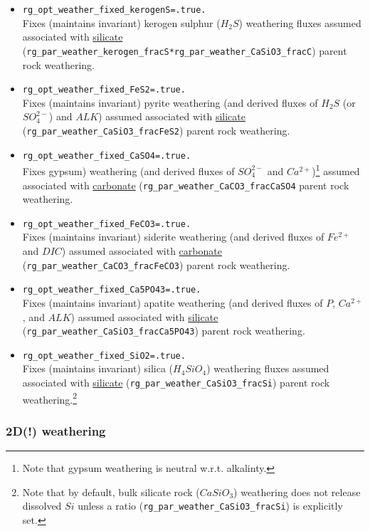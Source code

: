 \begin{enumerate}[noitemsep]
\begin{itemize}[noitemsep]
\item \texttt{rg\_opt\_weather\_fixed\_kerogenS=.true.}
\\Fixes (maintains invariant) kerogen sulphur (\(H_{2}S\)) weathering fluxes assumed associated with \uline{silicate} (\texttt{rg\_par\_weather\_kerogen\_fracS*rg\_par\_weather\_CaSiO3\_fracC}) parent rock weathering.
\item \texttt{rg\_opt\_weather\_fixed\_FeS2=.true.}
\\Fixes (maintains invariant) pyrite weathering (and derived fluxes of \(H_{2}S\) (or \(SO^{2-}_{4}\)) and \(ALK\)) assumed associated with \uline{silicate} (\texttt{rg\_par\_weather\_CaSiO3\_fracFeS2}) parent rock weathering.
\item \texttt{rg\_opt\_weather\_fixed\_CaSO4=.true.}
\\Fixes gypsum) weathering (and derived fluxes of \(SO^{2-}_{4}\) and \(Ca^{2+}\))\footnote{Note that gypsum weathering is neutral w.r.t. alkalinty.} assumed associated with \uline{carbonate} (\texttt{rg\_par\_weather\_CaCO3\_fracCaSO4} parent rock weathering.  
\item \texttt{rg\_opt\_weather\_fixed\_FeCO3=.true.}
\\Fixes (maintains invariant) siderite weathering (and derived fluxes of \(Fe^{2+}\) and \(DIC\)) assumed associated  with \uline{carbonate} (\texttt{rg\_par\_weather\_CaCO3\_fracFeCO3}) parent rock weathering.
\item \texttt{rg\_opt\_weather\_fixed\_Ca5PO43=.true.}
\\Fixes (maintains invariant)  apatite weathering (and derived fluxes of \(P\), \(Ca^{2+}\), and \(ALK\)) assumed associated with \uline{silicate} (\texttt{rg\_par\_weather\_CaSiO3\_fracCa5PO43}) parent rock weathering. \item \texttt{rg\_opt\_weather\_fixed\_SiO2=.true.}
\\Fixes (maintains invariant) silica (\(H_{4}SiO_{4}\)) weathering fluxes assumed associated with \uline{silicate} (\texttt{rg\_par\_weather\_CaSiO3\_fracSi}) parent rock weathering.\footnote{Note that by default, bulk silicate rock (\(CaSiO_{3}\)) weathering does not release dissolved \(Si\) unless a ratio (\texttt{rg\_par\_weather\_CaSiO3\_fracSi}) is explicitly set.}
\end{itemize}

\end{enumerate}

%
\newpage
\subsubsection{2D(!) weathering}\label{2Dweathering}
\vspace{1mm}

